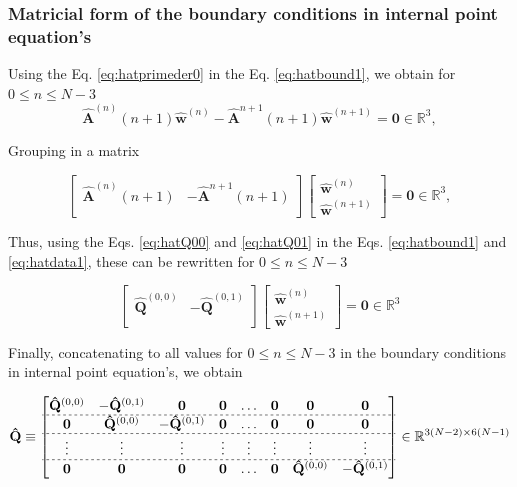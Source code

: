 \subsubsection{Matricial form of the boundary conditions in internal point equation's}
Using %
the Eq. \ref{eq:hatprimeder0} in 
the Eq. \ref{eq:hatbound1},
we obtain for $0 \leq n\leq N-3$
\begin{equation}
 \mathbf{\hat{A}}^{(n)}(n+1) \mathbf{\hat{w}}^{(n)} - \mathbf{\hat{A}}^{n+1}(n+1) \mathbf{\hat{w}}^{(n+1)} 
 =
 \mathbf{0} \in \mathbb{R}^{3},
\end{equation}

Grouping in a matrix

\begin{equation}\label{eq:hatdata1}
\begin{bmatrix}
\mathbf{\hat{A}}^{(n)}(n+1) & -\mathbf{\hat{A}}^{n+1}(n+1)\\
\end{bmatrix}
\begin{bmatrix}
\mathbf{\hat{w}}^{(n)}\\
\mathbf{\hat{w}}^{(n+1)}
\end{bmatrix}
=\mathbf{0}\in \mathbb{R}^{3},
\end{equation}

Thus,
using the Eqs. \ref{eq:hatQ00} and \ref{eq:hatQ01} in 
the Eqs. \ref{eq:hatbound1} and \ref{eq:hatdata1}, 
these can be rewritten for $0 \leq n\leq N-3$

\begin{equation}
\begin{bmatrix}
\mathbf{\hat{Q}}^{(0,0)} & -\mathbf{\hat{Q}}^{(0,1)}\\
\end{bmatrix}
\begin{bmatrix}
\mathbf{\hat{w}}^{(n)}\\
\mathbf{\hat{w}}^{(n+1)}
\end{bmatrix}
=\mathbf{0}\in \mathbb{R}^{3}
\end{equation}

Finally, 
concatenating to all values for $0 \leq n\leq N-3$
in the boundary conditions in internal point equation's, we obtain

\begin{equation}
\mathbf{\hat{Q}}
\equiv
\begin{bmatrix}
\mathbf{\hat{Q}}^{(0,0)} & -\mathbf{\hat{Q}}^{(0,1)} & \mathbf{0} & \mathbf{0} & \hdots & \mathbf{0} & \mathbf{0} & \mathbf{0}\\ \hdashline[2pt/2pt]
\mathbf{0} & \mathbf{\hat{Q}}^{(0,0)} & -\mathbf{\hat{Q}}^{(0,1)} & \mathbf{0} & \hdots & \mathbf{0} & \mathbf{0} & \mathbf{0}\\ \hdashline[2pt/2pt]
\vdots     & \vdots             & \vdots             & \vdots     & \vdots & \vdots     & \vdots     & \vdots    \\ \hdashline[2pt/2pt]
\mathbf{0} & \mathbf{0}         & \mathbf{0}         & \mathbf{0} & \hdots & \mathbf{0} & \mathbf{\hat{Q}}^{(0,0)} & -\mathbf{\hat{Q}}^{(0,1)}\\
\end{bmatrix}
\in \mathbb{R}^{3(N-2)\times 6(N-1)}
\end{equation}

